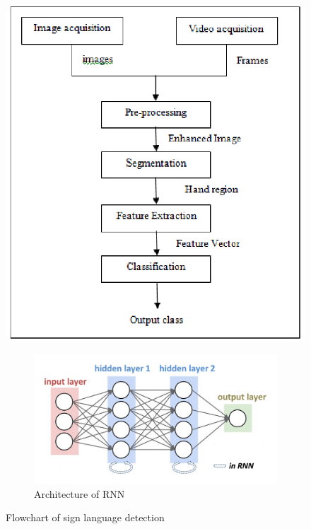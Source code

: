 \begin{figure}[ht]
    \centering
    \includegraphics[width=1.0\linewidth]{images/flowchart.1.png}
\begin{figure}
        \centering
        \includegraphics[width=1.0\linewidth]{images/Rnn.jpg}
        \caption{Architecture of RNN}
        \label{fig:enter-label}
    \end{figure}
        \caption{Flowchart of sign language detection}
    \label{fig:flowchart-sign-language}
\end{figure}
\newpage
